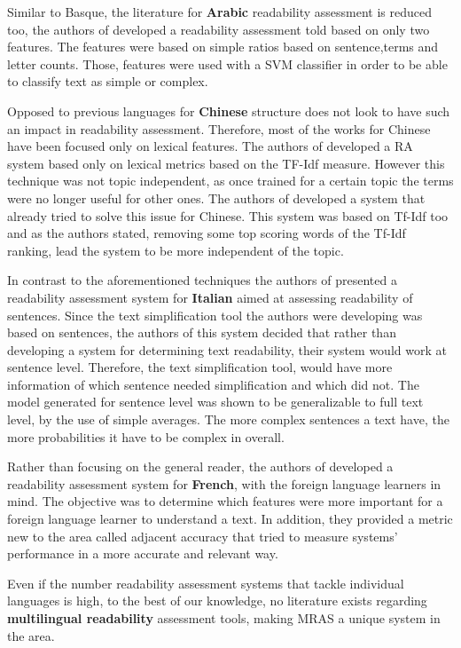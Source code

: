\documentclass[12pt]{article}
\begin{document}
Similar to Basque, the literature for \textbf{Arabic} readability assessment is reduced too, the authors of \cite{al2008towards} developed a readability assessment told based on only two features. The features were based on simple ratios based on sentence,terms and letter counts. Those, features were used with a SVM classifier in order to be able to classify text as simple or complex.

Opposed to previous languages for \textbf{Chinese} structure does not look to have such an impact in readability assessment. Therefore, most of the works for Chinese have been focused only on lexical features. The authors of \cite{chen2011chinese} developed a RA system  based only on lexical metrics based on the TF-Idf measure. However this technique was not topic independent, as once trained for a certain topic the terms were no longer useful for other ones. The authors of \cite{collins2004language} developed a system that already tried to solve this issue for Chinese. This system was based on Tf-Idf too and as the authors stated, removing some top scoring words of the Tf-Idf ranking, lead the system to be more independent of the topic. 

In contrast to the aforementioned techniques the authors of \cite{dell2011read}   presented a readability assessment system for \textbf{Italian} aimed at assessing readability of sentences. Since the text simplification tool the authors were developing was based on sentences, the authors of this system decided that rather than developing a system for determining text readability, their system would work at sentence level. Therefore, the text simplification tool, would have more information of which sentence needed simplification and which did not. The model generated for sentence level was shown to be generalizable to full text level, by the use of simple averages. The more complex sentences a text have, the more probabilities it have to be complex in overall.

Rather than focusing on the general reader,  the authors of \cite{franccois2012ai} developed a readability assessment system for \textbf{French}, with the foreign language learners in mind. The objective was to determine which features were more important for a foreign language learner to understand a text. In addition, they provided a metric new to the area called adjacent accuracy that tried to measure systems' performance in a more accurate and relevant way. 

Even if the number readability assessment systems that tackle individual languages is high, to the best of our knowledge, no literature exists regarding \textbf{multilingual readability} assessment tools, making MRAS a unique system in the area.
\end{document}
